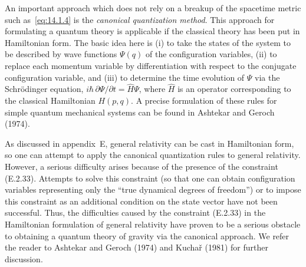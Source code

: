 An important approach which does not rely on a breakup of the spacetime metric
such as~\eqref{eq:14.1.4} is the \emph{canonical quantization method}. This approach for
formulating a quantum theory is applicable if the classical theory has been put in
Hamiltonian form. The basic idea here is (i) to take the states of the system to be
described by wave functions \(\Psi(q)\) of the configuration variables, (ii) to replace each
momentum variable by differentiation with respect to the conjugate configuration
variable, and (iii) to determine the time evolution of \(\Psi\) via the Schrödinger equation,
\(i\hbar\,\partial\Psi/\partial t=\widehat H\Psi\), where \(\widehat H\) is an operator corresponding
to the classical Hamiltonian \(H(p,q)\). A precise formulation of these rules for simple
quantum mechanical systems can be found in Ashtekar and Geroch (1974).

As discussed in appendix~E, general relativity can be cast in Hamiltonian form,
so one can attempt to apply the canonical quantization rules to general relativity.
However, a serious difficulty arises because of the presence of the constraint
(E.2.33). Attempts to solve this constraint (so that one can obtain configuration
variables representing only the ``true dynamical degrees of freedom'') or to impose
this constraint as an additional condition on the state vector have not been successful.
Thus, the difficulties caused by the constraint (E.2.33) in the Hamiltonian formulation
of general relativity have proven to be a serious obstacle to obtaining a
quantum theory of gravity via the canonical approach. We refer the reader to
Ashtekar and Geroch (1974) and Kuchař (1981) for further discussion.

